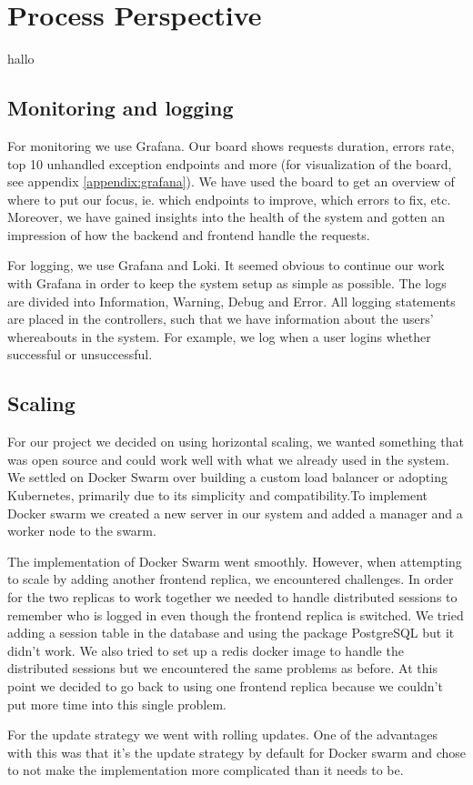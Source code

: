 \section{Process Perspective}
hallo \cite{devopshandbook}
\subsection{Monitoring and logging}
For monitoring we use Grafana. Our board shows requests duration, errors rate, top 10 unhandled exception endpoints and more (for visualization of the board, see appendix \ref{appendix:grafana}). We have used the board to get an overview of where to put our focus, ie. which endpoints to improve, which errors to fix, etc. Moreover, we have gained insights into the health of the system and gotten an impression of how the backend and frontend handle the requests.

For logging, we use Grafana and Loki. It seemed obvious to continue our work with Grafana in order to keep the system setup as simple as possible. The logs are divided into Information, Warning, Debug and Error. All logging statements are placed in the controllers, such that we have information about the users' whereabouts in the system. For example, we log when a user logins whether successful or unsuccessful.

\subsection{Scaling}
For our project we decided on using horizontal scaling, we wanted something that was open source and could work well with what we already used in the system. We settled on Docker Swarm over building a custom load balancer or adopting Kubernetes, primarily due to its simplicity and compatibility.To implement Docker swarm we created a new server in our system and added a manager and a worker node to the swarm. 

The implementation of Docker Swarm went smoothly. However, when attempting to scale by adding another frontend replica, we encountered challenges. In order for the two replicas to work together we needed to handle distributed sessions to remember who is logged in even though the frontend replica is switched. We tried adding a session table in the database and using the package PostgreSQL but it didn’t work. We also tried to set up a redis docker image to handle the distributed sessions but we encountered the same problems as before. At this point we decided to go back to using one frontend replica because we couldn’t put more time into this single problem. 

For the update strategy we went with rolling updates. One of the advantages with this was that it’s the update strategy by default for Docker swarm and chose to not make the implementation more complicated than it needs to be. 

